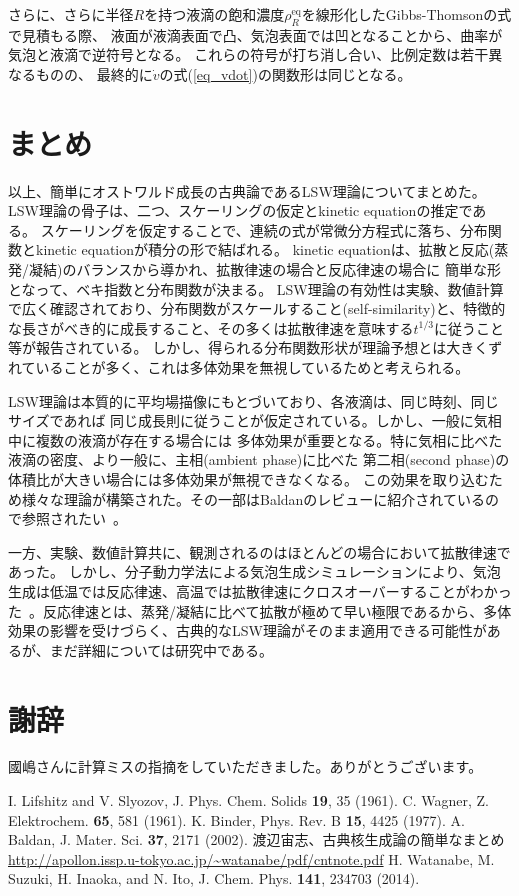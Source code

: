 \documentclass{jarticle}
\begin{document}
さらに、さらに半径$R$を持つ液滴の飽和濃度$\rho_R^{\mathrm{eq}}$を線形化したGibbs-Thomsonの式で見積もる際、
液面が液滴表面で凸、気泡表面では凹となることから、曲率が気泡と液滴で逆符号となる。
これらの符号が打ち消し合い、比例定数は若干異なるものの、
最終的に$\dot{v}$の式(\ref{eq_vdot})の関数形は同じとなる。

\section{まとめ}
以上、簡単にオストワルド成長の古典論であるLSW理論についてまとめた。
LSW理論の骨子は、二つ、スケーリングの仮定とkinetic equationの推定である。
スケーリングを仮定することで、連続の式が常微分方程式に落ち、分布関数とkinetic equationが積分の形で結ばれる。
kinetic equationは、拡散と反応(蒸発/凝結)のバランスから導かれ、拡散律速の場合と反応律速の場合に
簡単な形となって、ベキ指数と分布関数が決まる。
LSW理論の有効性は実験、数値計算で広く確認されており、分布関数がスケールすること(self-similarity)と、特徴的な長さがべき的に成長すること、その多くは拡散律速を意味する$t^{1/3}$に従うこと等が報告されている。
しかし、得られる分布関数形状が理論予想とは大きくずれていることが多く、これは多体効果を無視しているためと考えられる。

LSW理論は本質的に平均場描像にもとづいており、各液滴は、同じ時刻、同じサイズであれば
同じ成長則に従うことが仮定されている。しかし、一般に気相中に複数の液滴が存在する場合には
多体効果が重要となる。特に気相に比べた液滴の密度、より一般に、主相(ambient phase)に比べた
第二相(second phase)の体積比が大きい場合には多体効果が無視できなくなる。
この効果を取り込むため様々な理論が構築された。その一部はBaldanのレビューに紹介されているので参照されたい~\cite{Baldan}。

一方、実験、数値計算共に、観測されるのはほとんどの場合において拡散律速であった。
しかし、分子動力学法による気泡生成シミュレーションにより、気泡生成は低温では反応律速、高温では拡散律速にクロスオーバーすることがわかった~\cite{Watanabe2014}。反応律速とは、蒸発/凝結に比べて拡散が極めて早い極限であるから、多体効果の影響を受けづらく、古典的なLSW理論がそのまま適用できる可能性があるが、まだ詳細については研究中である。

\section{謝辞}

國嶋さんに計算ミスの指摘をしていただきました。ありがとうございます。

\begin{thebibliography}{9}
     I. Lifshitz and V. Slyozov, J. Phys. Chem. Solids \textbf{19}, 35 (1961).
     C. Wagner, Z. Elektrochem. \textbf{65}, 581 (1961).
     K. Binder, Phys. Rev. B \textbf{15}, 4425 (1977).
     A. Baldan, J. Mater. Sci. \textbf{37}, 2171 (2002).
     渡辺宙志、古典核生成論の簡単なまとめ\\ \url{http://apollon.issp.u-tokyo.ac.jp/~watanabe/pdf/cntnote.pdf}
     H. Watanabe, M. Suzuki, H. Inaoka, and N. Ito, J. Chem. Phys. \textbf{141}, 234703 (2014).
\end{thebibliography}
\end{document}
